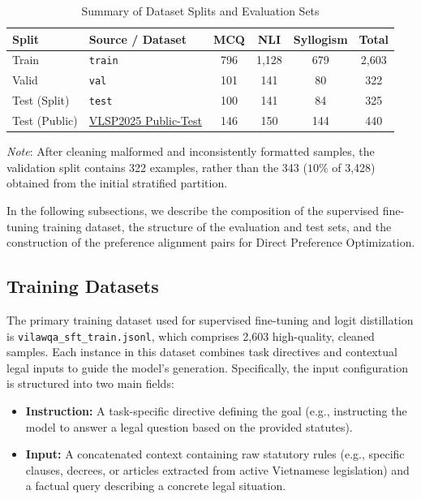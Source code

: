 \begin{table}[htbp]
\centering
\caption{Summary of Dataset Splits and Evaluation Sets}
\label{tab:dataset_summary}
\begin{tabular}{llcccc}
\hline
\textbf{Split} & \textbf{Source / Dataset} & \textbf{MCQ} & \textbf{NLI} & \textbf{Syllogism} & \textbf{Total} \\ \hline
Train & \texttt{train} & 796 & 1,128 & 679 & 2,603 \\
Valid & \texttt{val} & 101 & 141 & 80 & 322 \\
Test (Split) & \texttt{test} & 100 & 141 & 84 & 325 \\
Test (Public) & \href{https://huggingface.co/datasets/VLSP2025-LegalSML/Public-Test}{VLSP2025 Public-Test} & 146 & 150 & 144 & 440 \\ \hline
\end{tabular}

\vspace{2pt}
{\footnotesize \textit{Note}: After cleaning malformed and inconsistently formatted samples, the validation split contains 322 examples, rather than the 343 ($10\%$ of 3,428) obtained from the initial stratified partition.}
\end{table}

In the following subsections, we describe the composition of the supervised fine-tuning training dataset, the structure of the evaluation and test sets, and the construction of the preference alignment pairs for Direct Preference Optimization.

\subsection{Training Datasets}

The primary training dataset used for supervised fine-tuning and logit distillation is \texttt{vilawqa\_sft\_train.jsonl}, which comprises 2,603 high-quality, cleaned samples. Each instance in this dataset combines task directives and contextual legal inputs to guide the model's generation. Specifically, the input configuration is structured into two main fields:
\begin{itemize}
    \item \textbf{Instruction:} A task-specific directive defining the goal (e.g., instructing the model to answer a legal question based on the provided statutes).
    \item \textbf{Input:} A concatenated context containing raw statutory rules (e.g., specific clauses, decrees, or articles extracted from active Vietnamese legislation) and a factual query describing a concrete legal situation.
\end{itemize}

